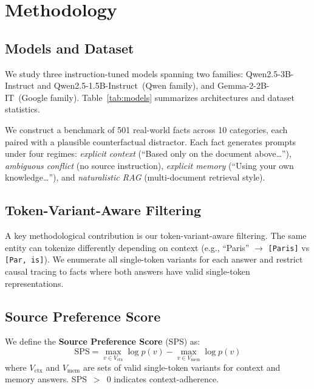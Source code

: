\documentclass{article}
\begin{document}
\section{Methodology}
\label{sec:method}

\subsection{Models and Dataset}

We study three instruction-tuned models spanning two families: Qwen2.5-3B-Instruct and Qwen2.5-1.5B-Instruct~(Qwen family), and Gemma-2-2B-IT~(Google family). Table~\ref{tab:models} summarizes architectures and dataset statistics.

We construct a benchmark of 501 real-world facts across 10 categories, each paired with a plausible counterfactual distractor. Each fact generates prompts under four regimes: \textit{explicit context} (``Based only on the document above\ldots''), \textit{ambiguous conflict} (no source instruction), \textit{explicit memory} (``Using your own knowledge\ldots''), and \textit{naturalistic RAG} (multi-document retrieval style).



\subsection{Token-Variant-Aware Filtering}

A key methodological contribution is our token-variant-aware filtering. The same entity can tokenize differently depending on context (e.g., ``Paris'' $\to$ \texttt{[Paris]} vs \texttt{[Par, is]}). We enumerate all single-token variants for each answer and restrict causal tracing to facts where both answers have valid single-token representations.

\subsection{Source Preference Score}

We define the \textbf{Source Preference Score} (SPS) as:
\begin{equation}
\text{SPS} = \max_{v \in V_{\text{ctx}}} \log p(v) - \max_{v \in V_{\text{mem}}} \log p(v)
\label{eq:sps}
\end{equation}
where $V_{\text{ctx}}$ and $V_{\text{mem}}$ are sets of valid single-token variants for context and memory answers. SPS~$>$~0 indicates context-adherence.
\end{document}
